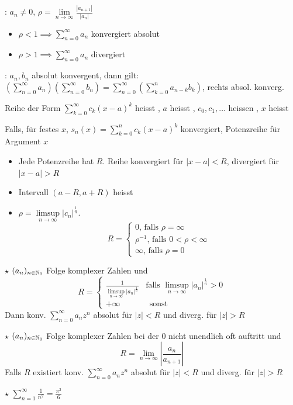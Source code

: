 \Satz {}: $a_n\ne 0$, $\rho = \lim\limits_{n\to\infty} \frac{|a_{n+1}|}{|a_n|}$
\vspace{-0.6em}
\begin{itemize}
    \item $\rho < 1 \implies \sum_{n=0}^{\infty} a_n$ konvergiert absolut
    \item $\rho > 1 \implies \sum_{n=0}^{\infty} a_n$ divergiert
\end{itemize}

\Satz {}: $a_n, b_n$ absolut konvergent, dann gilt:
$(\sum_{n=0}^{\infty} a_n)(\sum_{n=0}^{\infty} b_n) = \sum_{n=0}^{\infty} (\sum_{k=0}^{n} a_{n-k} b_k)$,
rechts absol. konverg.

\Def Reihe der Form $\sum_{k=0}^{\infty} c_k(x-a)^k$ heisst ,
$a$ heisst , $c_0, c_1, \ldots$ heissen , $x$ heisst 

\Def Falls, für festes $x$, $s_n(x) = \sum_{k=0}^{n} c_k (x-a)^k$ konvergiert,
Potenzreihe  für Argument $x$

\Satz
\vspace{-0.6em}
\begin{itemize}
    \item Jede Potenzreihe hat  $R$. Reihe konvergiert für $|x-a| < R$, divergiert für $|x-a| > R$
    \item Intervall $(a-R, a+R)$ heisst 
    \item $\rho = \limsup\limits_{n\to\infty} |c_n|^\frac{1}{n}$. \vspace{-2em}
        \begin{equation*}R = \begin{cases}
            0\text{, falls } \rho = \infty \\
            \rho^{-1}\text{, falls } 0 < \rho < \infty \\
            \infty\text{, falls } \rho = 0
        \end{cases}\end{equation*}
\end{itemize}

\Satz $\star$ $(a_n)_{n\in\mathbb{N}_0}$ Folge komplexer Zahlen und
$$R = \begin{cases} \frac{1}{\limsup \limits_{n\to\infty}|a_n|^{\frac{1}{n}}} \hspace{10pt}\text{falls } \limsup\limits_{n\to\infty} |a_n|^{\frac{1}{n}} > 0 \\ +\infty \hspace{43pt}\text{sonst}\end{cases}$$
Dann konv. $\sum^\infty_{n=0} a_nz^n$ absolut für $|z| < R$ und diverg. für $|z| > R$

\Satz $\star$ $(a_n)_{n\in\mathbb{N}_0}$ Folge komplexer Zahlen bei der 0 nicht unendlich oft auftritt und
$$R = \lim_{n\to\infty} \left|\frac{a_n}{a_{n+1}}\right|$$
Falls $R$ existiert konv. $\sum^\infty_{n=0} a_nz^n$ absolut für $|z| < R$ und diverg. für $|z| > R$

\Satz $\star$ $\sum_{n=1}^\infty \frac{1}{n^2} = \frac{\pi^2}{6}$
